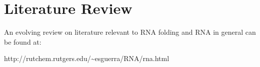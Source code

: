 \part{Literature Review}

An evolving review on literature relevant to RNA folding and RNA in general can be found at:

http://rutchem.rutgers.edu/\~{}esguerra/RNA/rna.html


